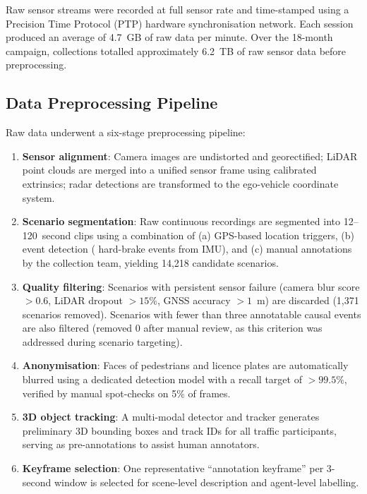 Raw sensor streams were recorded at full sensor rate and time-stamped using a
Precision Time Protocol (PTP) hardware synchronisation network. Each session
produced an average of 4.7~GB of raw data per minute. Over the 18-month campaign,
collections totalled approximately 6.2~TB of raw sensor data before preprocessing.

\subsection{Data Preprocessing Pipeline}
\label{ssec:preprocessing}

Raw data underwent a six-stage preprocessing pipeline:

\begin{enumerate}[leftmargin=2em, noitemsep]
  \item \textbf{Sensor alignment}: Camera images are undistorted and georectified;
        LiDAR point clouds are merged into a unified sensor frame using calibrated
        extrinsics; radar detections are transformed to the ego-vehicle coordinate system.
  \item \textbf{Scenario segmentation}: Raw continuous recordings are segmented into
        12--120~second clips using a combination of (a) GPS-based location triggers,
        (b) event detection (\eg{} hard-brake events from IMU), and (c) manual annotations
        by the collection team, yielding 14,218 candidate scenarios.
  \item \textbf{Quality filtering}: Scenarios with persistent sensor failure (camera blur
        score $> 0.6$, LiDAR dropout $> 15\%$, GNSS accuracy $> 1$~m) are discarded
        (1,371 scenarios removed). Scenarios with fewer than three annotatable causal
        events are also filtered (removed 0 after manual review, as this criterion was
        addressed during scenario targeting).
  \item \textbf{Anonymisation}: Faces of pedestrians and licence plates are automatically
        blurred using a dedicated detection model with a recall target of $> 99.5\%$,
        verified by manual spot-checks on 5\% of frames.
  \item \textbf{3D object tracking}: A multi-modal detector and tracker generates
        preliminary 3D bounding boxes and track IDs for all traffic participants,
        serving as pre-annotations to assist human annotators.
  \item \textbf{Keyframe selection}: One representative ``annotation keyframe'' per
        3-second window is selected for scene-level description and agent-level labelling.
\end{enumerate}

